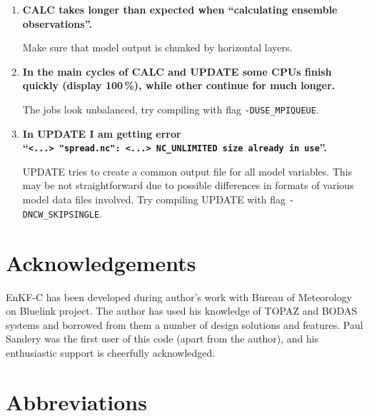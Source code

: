 \documentclass[11pt]{report}
\begin{document}
\begin{enumerate}
\item{\bf CALC takes longer than expected when ``calculating ensemble observations''.}

Make sure that model output is chunked by horizontal layers.

\item{\bf In the main cycles of CALC and UPDATE some CPUs finish quickly (display 100\,\%), while other continue for much longer.}

The jobs look unbalanced, try compiling with flag \verb|-DUSE_MPIQUEUE|.

\item{\bf In UPDATE I am getting error \\``\verb|<...> "spread.nc": <...> NC_UNLIMITED size already in use|''.}

UPDATE tries to create a common output file for all model variables.
This may be not straightforward due to possible differences in formats of various model data files involved.
Try compiling UPDATE with flag \verb|-DNCW_SKIPSINGLE|.

\end{enumerate}

\chapter*{Acknowledgements}

EnKF-C has been developed during author's work with Bureau of Meteorology on Bluelink project.
The author has used his knowledge of TOPAZ \citep{sak12b} and BODAS \citep{oke08b} systems and borrowed from them a number of design solutions and features.
Paul Sandery was the first user of this code (apart from the author), and his enthusiastic support is cheerfully acknowledged.

\clearpage

\nocite{eve94a}
\nocite{eve03a}
\nocite{hun04a}
\nocite{hun07a}
\nocite{sak08a}
\nocite{sak10a}
\nocite{sak11a}




\clearpage

\chapter*{Abbreviations}
\end{document}
